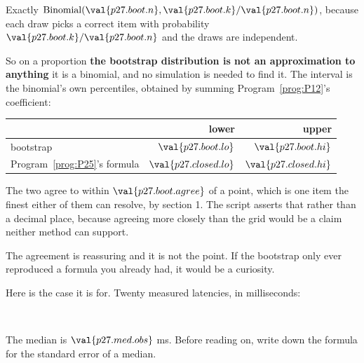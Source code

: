 \begin{fr}

Exactly $\mathrm{Binomial}(\val{p27.boot.n}, \val{p27.boot.k}/\val{p27.boot.n})$,
because each draw picks a correct item with probability
$\val{p27.boot.k}/\val{p27.boot.n}$ and the draws are independent.

So on a proportion \textbf{the bootstrap distribution is not an
approximation to anything} \dash{} it is a binomial, and no simulation is
needed to find it. The interval is the binomial's own percentiles, obtained by
summing Program~\ref{prog:P12}'s coefficient:

\begin{center}
\begin{tabular}{lrr}
\toprule
& lower & upper \\
\midrule
bootstrap & $\val{p27.boot.lo}$ & $\val{p27.boot.hi}$ \\
Program~\ref{prog:P25}'s formula & $\val{p27.closed.lo}$ &
  $\val{p27.closed.hi}$ \\
\bottomrule
\end{tabular}
\end{center}

The two agree to within $\val{p27.boot.agree}$ of a point, which is one
item \dash{} the finest either of them can resolve, by section 1. The script
asserts that rather than a decimal place, because agreeing more closely than
the grid would be a claim neither method can support.
\end{fr}

\begin{fr}
The agreement is reassuring and it is not the point. If the bootstrap only
ever reproduced a formula you already had, it would be a curiosity.

Here is the case it is for. Twenty measured latencies, in milliseconds:

\begin{center}
\\
\end{center}

The median is $\val{p27.med.obs}$ ms. Before reading on, write down the
formula for the standard error of a median.
\dotline
\nextframe
\end{fr}

